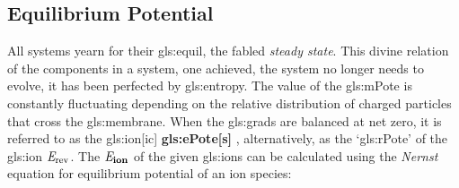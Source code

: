 \documentclass[class={myRUCProject}, crop=false]{standalone}
\begin{document}
\subsection{Equilibrium Potential}
\begingroup
\allowdisplaybreaks
All systems yearn for their \gls{gls:equil}, the fabled \textit{steady state}. This divine relation of the components in a system, one achieved, the system no longer needs to evolve, it has been perfected by \gls{gls:entropy}.
The value of the \gls{gls:mPote} is constantly fluctuating depending on the relative distribution of charged particles that cross the \gls{gls:membrane}.
When the \glspl{gls:grad} are balanced at net zero, it is referred to as the \gls{gls:ion}[ic] \textbf{\gls{gls:ePote}[s]} \br{\equi\ion}, alternatively, as the `\gls{gls:rPote}' of the \gls{gls:ion} \(\mathit{E}_\mathrm{rev}\). 
The \(\mathit{E}_\mathbf{ion}\) of the given \glspl{gls:ion} can be calculated using the \emph{Nernst} equation for equilibrium potential of an ion species:
\end{document}
